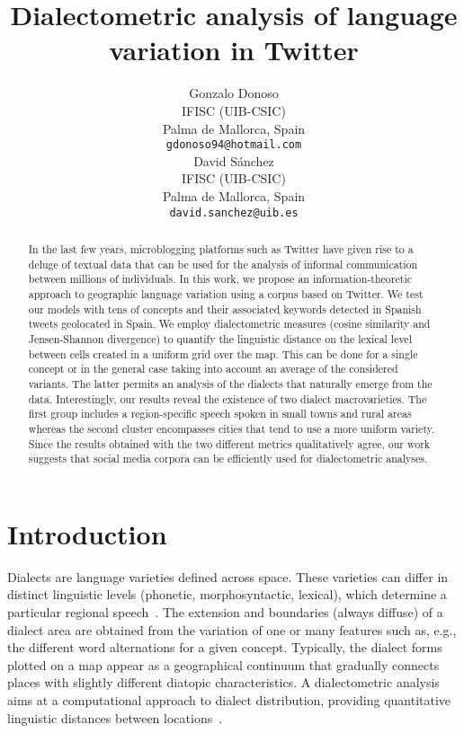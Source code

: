 \documentclass[11pt]{article}
\title{Dialectometric analysis of language variation in Twitter}
\author{Gonzalo Donoso \\
  IFISC (UIB-CSIC) \\
  Palma de Mallorca, Spain \\
  {\tt gdonoso94@hotmail.com} \\\And
  David S\'anchez \\
  IFISC (UIB-CSIC) \\
  Palma de Mallorca, Spain \\
  {\tt david.sanchez@uib.es} \\}
\date{}
\begin{document}
\maketitle
\begin{abstract}
In the last few years, microblogging platforms such as Twitter
have given rise to a deluge of textual data that can be used for the analysis of informal communication between millions of individuals.
In this work, we propose an information-theoretic approach to geographic language variation using a corpus based on Twitter.
We test our models with tens of concepts and their associated keywords detected in Spanish tweets geolocated in Spain.
We employ dialectometric measures (cosine similarity and Jensen-Shannon divergence)
to quantify the linguistic distance on the lexical level between cells created in a uniform grid over the map.
This can be done for a single concept or in the general case taking into account an average of the considered
variants. The latter permits an analysis of the dialects that naturally emerge from the data.
Interestingly, our results reveal the existence of two dialect macrovarieties. 
The first group includes a region-specific speech spoken in small towns
and rural areas whereas the second cluster encompasses cities that tend to use a more uniform variety.
Since the results obtained with the two different metrics qualitatively agree,
our work suggests that social media corpora can be efficiently used
for dialectometric analyses.
\end{abstract}

\section{Introduction}

Dialects are language varieties defined across space. These varieties can differ in distinct linguistic levels
(phonetic, morphosyntactic, lexical), which determine a particular regional speech~\cite{chambers98-1}.
The extension and boundaries (always diffuse) of a dialect area are obtained from the variation of one or many
features such as, e.g., the different word alternations for a given concept. Typically, the dialect forms plotted
on a map appear as a geographical continuum that gradually connects places with slightly different diatopic
characteristics. A dialectometric analysis aims at a computational approach to dialect distribution, providing
quantitative linguistic distances between locations~\cite{seg71,goe06,wie15}.
\end{document}
